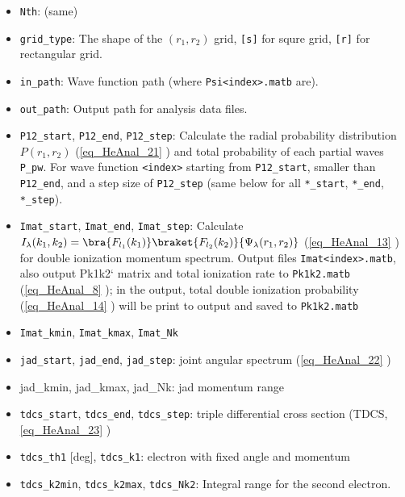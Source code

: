 
\begin{itemize}
\item \verb`Nth`: (same)
\item \verb`grid_type`: The shape of the $(r_1,r_2)$ grid, \verb`[s]` for squre grid, \verb`[r]` for rectangular grid.
\item \verb`in_path`: Wave function path (where \verb`Psi<index>.matb` are).
\item \verb`out_path`: Output path for analysis data files.

\item \verb`P12_start`, \verb`P12_end`, \verb`P12_step`: Calculate the radial probability distribution $P(r_1, r_2)$ (\autoref{eq_HeAnal_21} ) and total probability of each partial waves \verb`P_pw`. For wave function \verb`<index>` starting from \verb`P12_start`, smaller than \verb`P12_end`, and a step size of \verb`P12_step` (same below for all \verb`*_start`, \verb`*_end`, \verb`*_step`).

\item \verb`Imat_start`, \verb`Imat_end`, \verb`Imat_step`: Calculate $I_\lambda(k_1, k_2) = \bra{F_{l_1}(k_1)}\braket{F_{l_2}(k_2)}{\Psi_\lambda(r_1,r_2)}$ (\autoref{eq_HeAnal_13} ) for double ionization momentum spectrum. Output files \verb`Imat<index>.matb`, also output Pk1k2` matrix and total ionization rate to \verb`Pk1k2.matb` (\autoref{eq_HeAnal_8} ); in the output, total double ionization probability (\autoref{eq_HeAnal_14} ) will be print to output and saved to \verb`Pk1k2.matb`
\item \verb`Imat_kmin`, \verb`Imat_kmax`, \verb`Imat_Nk`

\item \verb`jad_start`, \verb`jad_end`, \verb`jad_step`: joint angular spectrum (\autoref{eq_HeAnal_22} )
\item jad_kmin, jad_kmax, jad_Nk: jad momentum range

\item \verb`tdcs_start`, \verb`tdcs_end`, \verb`tdcs_step`: triple differential cross section (TDCS, \autoref{eq_HeAnal_23} )
\item \verb`tdcs_th1` [deg], \verb`tdcs_k1`: electron with fixed angle and momentum
\item \verb`tdcs_k2min`, \verb`tdcs_k2max`, \verb`tdcs_Nk2`: Integral range for the second electron.


\end{itemize}

